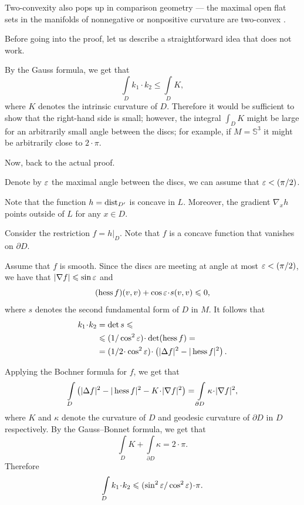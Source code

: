 Two-convexity also pops up in comparison geometry --- the maximal open flat sets in the manifolds of nonnegative or nonpositive curvature are two-convex \cite{panov-petrunin}.


Before going into the proof, let us describe a straightforward idea that does not work.

By the Gauss formula, we get that 
\[\int\limits_{D}k_1\cdot k_2\le\int\limits_{D}K,\] 
where $K$ denotes the intrinsic curvature of $D$.
Therefore it would be sufficient to show that the right-hand side is small;
however, the integral $\int_{D}K$ might be large for an arbitrarily small angle between the discs; for example, if $M=\mathbb{S}^3$ it might be arbitrarily close to $2\cdot \pi$.

Now, back to the actual proof.

\medskip

Denote by $\varepsilon$ the maximal angle between the discs, we can assume that $\varepsilon<(\pi/2)$.

Note that the function $h=\operatorname{\rm dist}\nolimits_{D'}$ is concave in $L$.
Moreover, the gradient $\nabla_xh$ points outside of $L$ for any $x\in D$. 

Consider the restriction $f=h|_D$.
Note that $f$ is a concave function that vanishes on $\partial D$.

Assume that $f$ is smooth.
Since the discs are meeting at angle at most $\varepsilon<(\pi/2)$,
we have that $|\nabla f|\leqslant \sin\varepsilon$ and 
\[(\Hess f)(v,v)+ \cos\eps \cdot s(v,v)\le 0,\]
where $s$ denotes the second fundamental form of $D$ in $M$.
It follows that
\begin{align*}
k_1\cdot k_2&=\det s\le
\\
&\le \tfrac1{\cos^2\eps}\cdot \det(\Hess f)=
\\
&=\tfrac1{2\cdot\cos^2\eps}\cdot\left(|\Delta f|^2
-|\Hess f|^2\right).
\end{align*}


Applying the Bochner formula for $f$, we get that
\[\int\limits_D \left(|\Delta f|^2
-|\Hess f|^2
-K\cdot|\nabla f|^2\right)
=\int\limits_{\partial D}
\kappa\cdot|\nabla f|^2,\]
where $K$ and $\kappa$ denote the curvature of $D$ and geodesic curvature of $\partial D$ in $D$ respectively.
By the Gauss--Bonnet formula, we get that
\[\int\limits_D 
K+\int\limits_{\partial D}\kappa=2\cdot\pi.\]
Therefore
\[\int\limits_Dk_1\cdot k_2\le \tfrac{\sin^2 \eps}{\cos^2\eps}\cdot\pi.\]

